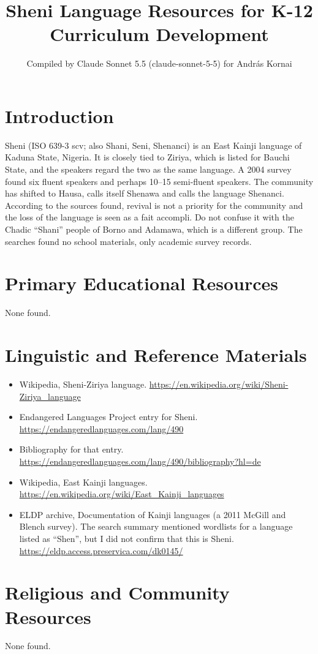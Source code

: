 \documentclass[12pt]{article}
\title{Sheni Language Resources for K-12 Curriculum Development}
\author{Compiled by Claude Sonnet 5.5 (claude-sonnet-5-5) for Andr\'as Kornai}
\date{}
\begin{document}
\maketitle

\section{Introduction}
Sheni (ISO 639-3 scv; also Shani, Seni, Shenanci) is an East Kainji language of Kaduna State, Nigeria. It is closely tied to Ziriya, which is listed for Bauchi State, and the speakers regard the two as the same language. A 2004 survey found six fluent speakers and perhaps 10--15 semi-fluent speakers. The community has shifted to Hausa, calls itself Shenawa and calls the language Shenanci. According to the sources found, revival is not a priority for the community and the loss of the language is seen as a fait accompli. Do not confuse it with the Chadic ``Shani'' people of Borno and Adamawa, which is a different group. The searches found no school materials, only academic survey records.

\section{Primary Educational Resources}
None found.

\section{Linguistic and Reference Materials}
\begin{itemize}
\item Wikipedia, Sheni-Ziriya language. \url{https://en.wikipedia.org/wiki/Sheni-Ziriya_language}
\item Endangered Languages Project entry for Sheni. \url{https://endangeredlanguages.com/lang/490}
\item Bibliography for that entry. \url{https://endangeredlanguages.com/lang/490/bibliography?hl=de}
\item Wikipedia, East Kainji languages. \url{https://en.wikipedia.org/wiki/East_Kainji_languages}
\item ELDP archive, Documentation of Kainji languages (a 2011 McGill and Blench survey). The search summary mentioned wordlists for a language listed as ``Shen'', but I did not confirm that this is Sheni. \url{https://eldp.access.preservica.com/dk0145/}
\end{itemize}

\section{Religious and Community Resources}
None found.
\end{document}
